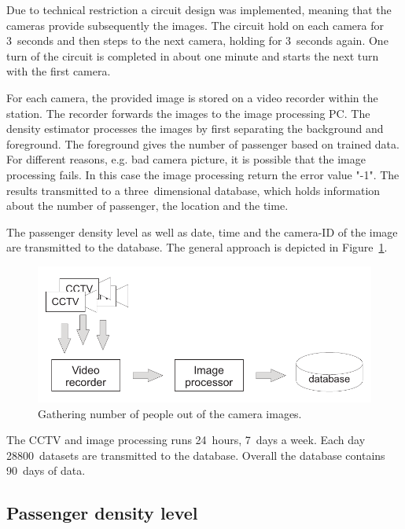 Due to technical restriction a circuit design was implemented, meaning that the cameras provide subsequently the images. The circuit hold on each camera for 3~seconds and then steps to the next camera, holding for 3~seconds again. One turn of the circuit is completed in about one minute and starts the next turn with the first camera.

For each camera, the provided image is stored on a video recorder within the station. The recorder forwards the images to the image processing PC. The density estimator processes the images by first separating the background and foreground. The foreground gives the number of passenger based on trained data.
For different reasons, e.g. bad camera picture, it is possible that the image processing fails. In this case the image processing return the error value "-1".
The results transmitted to a three~dimensional database, which holds information about the number of passenger, the location and the time.

The passenger density level as well as date, time and the camera-ID of the image are transmitted to the database. The general approach is depicted in Figure~\ref{fig:CCTVimageProcessing}.

\begin{figure}[htb]
  \centering
  \includegraphics[width=\linewidth]{Figures/imageProcessing.pdf} 
  \caption{Gathering number of people out of the camera images.}
  \label{fig:CCTVimageProcessing}
\end{figure}

The CCTV and image processing runs 24~hours, 7~days a week. Each day 28800~datasets are transmitted to the database. Overall the database contains 90~days of data.

\subsection{Passenger density level}
\label{subsec:PassengerDensityLevel}

